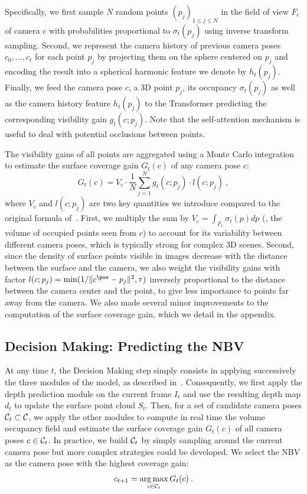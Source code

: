 Specifically, we first sample $N$ random points $(p_j)_{1\leq j\leq N}$ in the field of view $F_c$ of camera $c$ with probabilities proportional to $\sigma_t(p_j)$ using inverse transform sampling. Second, we represent the camera history of previous camera poses $c_0, ..., c_t$ for each point $p_j$ by projecting them on the sphere centered on $p_j$ and encoding the result into a spherical harmonic feature we denote by $h_t(p_j)$. Finally, we feed the camera pose $c$, a 3D point $p_j$, its occupancy $\sigma_t(p_j)$ as well as the camera history feature $h_t(p_j)$ to the Transformer predicting the corresponding visibility gain $g_t(c;p_j)$. Note that the self-attention mechanism is useful to deal with potential occlusions between points. 

The visibility gains of all points are aggregated using a Monte Carlo integration to estimate the surface coverage gain $G_t(c)$ of any camera pose $c$:%
\begin{equation}
    G_t(c) = V_c \cdot \frac{1}{N} \sum_{j=1}^N g_t(c; p_j) \cdot l(c; p_j) \> ,
    \label{coverage_gain}
\end{equation}
%
where $V_c$ and $l(c; p_j)$ are two key quantities we introduce compared to the original formula of~\cite{guedon-nips22-scone-surface-coverage}. First, we multiply the sum by $V_c = \int_{F_c} \sigma_t(p) dp$ (\ie, the volume of occupied points seen from $c$) to account for its variability between different camera poses, which is typically strong for complex 3D scenes. Second, since the density of surface points visible in images decrease with the distance between the surface and the camera, we also weight the visibility gains with factor $l(c; p_j) = \min(1/\|c^\pos-p_j\|^2,\tau)$ inversely proportional to the distance between the camera center and the point, to give less importance to points far away from the camera. We also made several minor improvements to the computation of the surface coverage gain, which we detail in the appendix.



\subsection{Decision Making: Predicting the NBV}

At any time $t$, the Decision Making step simply consists in applying successively the three modules of the model, as described in~.
Consequently, we first apply the depth prediction module on the current frame $I_t$ and use the resulting depth map $d_t$ to update the surface point cloud $S_t$. Then, for a set of candidate camera poses ${\cal C}_t \subset {\cal C}$, we apply the other modules to compute in real time the volume occupancy field and estimate the surface coverage gain $G_t(c)$ of all camera poses $c\in{\cal C}_t$.
%
In practice, we build ${\cal C}_t$ by simply sampling around the current camera pose but more complex strategies could be developed.
%
We select the NBV as the camera pose with the highest coverage gain:
%
\begin{equation}
    c_{t+1} = \operatorname*{arg\,max}_{c \in {\cal C}_t} G_t(c) \> .
\end{equation}

